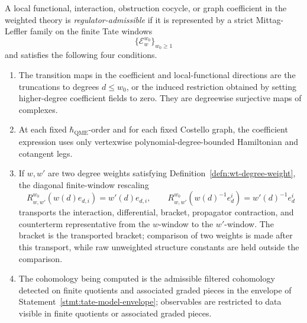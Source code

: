 \begin{defn}\label{defn:regulator-admissible-sector}
  A local functional, interaction, obstruction cocycle, or graph
  coefficient in the weighted theory is \emph{regulator-admissible} if
  it is represented by a strict Mittag-Leffler family on the finite Tate
  windows
  \[
    \{\mathcal E_w^{w_0}\}_{w_0\geq1}
  \]
  and satisfies the following four conditions.
  \begin{enumerate}[label=(A\arabic*)]
    \item The transition maps in the coefficient and local-functional
      directions are the truncations to degrees \(d\leq w_0\), or the
      induced restriction obtained by setting higher-degree coefficient
      fields to zero.  They are degreewise surjective maps of
      complexes.
    \item At each fixed \(\hbar_{\mathrm{QME}}\)-order and for each fixed Costello
      graph, the coefficient expression uses only vertexwise
      polynomial-degree-bounded Hamiltonian and cotangent legs.
    \item If \(w,w'\) are two degree weights satisfying
      Definition~\ref{defn:wt-degree-weight}, the diagonal finite-window
      rescaling
      \[
        R_{w,w'}^{w_0}(w(d)e_{d,i})=w'(d)e_{d,i},\qquad
        R_{w,w'}^{w_0}(w(d)^{-1}e^i_d)=w'(d)^{-1}e^i_d
      \]
	      transports the interaction, differential, bracket, propagator
	      contraction, and counterterm representative from the
	      \(w\)-window to the \(w'\)-window.  The bracket is the transported
	      bracket; comparison of two weights is made after this transport,
	      while raw unweighted structure constants are held outside the
	      comparison.
    \item The cohomology being computed is the admissible filtered
	      cohomology detected on finite quotients and associated graded
	      pieces in the envelope of Statement~\ref{stmt:tate-model-envelope};
	      observables are restricted to data visible in finite quotients or
	      associated graded pieces.
  \end{enumerate}
\end{defn}

